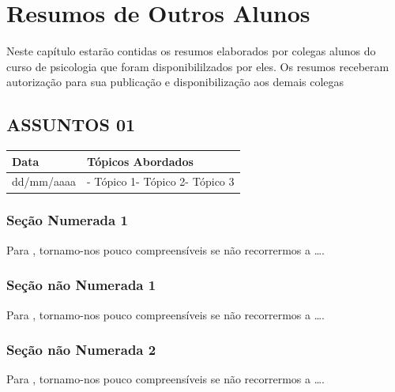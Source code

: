 \documentclass[
]{book}
\begin{document}
\hypertarget{resumos-de-outros-alunos}{%
\chapter{Resumos de Outros Alunos}\label{resumos-de-outros-alunos}}

Neste capítulo estarão contidas os resumos elaborados por colegas alunos do curso de psicologia que foram disponibililzados por eles. Os resumos receberam autorização para sua publicação e disponibilização aos demais colegas

\hypertarget{assuntos-01}{%
\section{ASSUNTOS 01}\label{assuntos-01}}

\begin{longtable}[]{@{}ll@{}}
\toprule()
Data & Tópicos Abordados \\
\midrule()
\endhead
dd/mm/aaaa & - Tópico 1- Tópico 2- Tópico 3 \\
\bottomrule()
\end{longtable}

\hypertarget{seuxe7uxe3o-numerada-1}{%
\subsection{Seção Numerada 1}\label{seuxe7uxe3o-numerada-1}}

Para \citet{BOCK2001}, tornamo-nos pouco compreensíveis se não recorrermos a \ldots.

\hypertarget{seuxe7uxe3o-nuxe3o-numerada-1}{%
\subsection*{Seção não Numerada 1}\label{seuxe7uxe3o-nuxe3o-numerada-1}}

Para \citet{BOCK2001}, tornamo-nos pouco compreensíveis se não recorrermos a \ldots.

\hypertarget{seuxe7uxe3o-nuxe3o-numerada-2}{%
\subsection*{Seção não Numerada 2}\label{seuxe7uxe3o-nuxe3o-numerada-2}}

Para \citet{BOCK2001}, tornamo-nos pouco compreensíveis se não recorrermos a \ldots.
\end{document}

